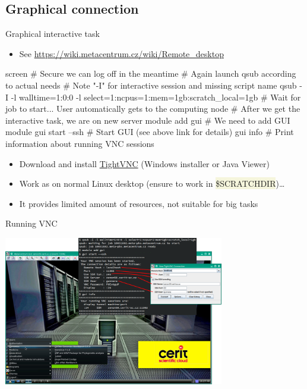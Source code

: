 \documentclass[compress, ucs, xelatex, 11pt, xcolor=svgnames, aspectratio=169,
	hyperref={
		bookmarks=true,
		unicode=true,
		colorlinks=true,
		pdftitle={Linux, command line and MetaCentrum},
		plainpages=false,
		pdfauthor={Vojtech Zeisek},
		pdfsubject={Course about use of Linux command line, writing shell scripts and using MetaCentrum of CESNET},
		pdfcreator={XeLaTeX},
		pdfkeywords={Linux, GNU, BASH, shell, command line, MetaCentrum},
		linkcolor=DarkRed, %
		anchorcolor=DarkBlue, %
		citecolor=Indigo, %
		filecolor=NavyBlue, %
		menucolor=DarkMagenta, %
		urlcolor=DarkBlue, %
		pdftex},
	url={hyphens, lowtilde} %
	]{beamer}
\renewcommand{\texttt}[1]{\colorbox{Beige}{{\ttfamily #1}}}
\begin{document}
\subsection{Graphical connection}

\begin{frame}[fragile]{Graphical interactive task}
	\begin{itemize}
		\item See \url{https://wiki.metacentrum.cz/wiki/Remote_desktop}
	\end{itemize}
	\begin{bashcode}
    screen # Secure we can log off in the meantime
    # Again launch qsub according to actual needs
    # Note "-I" for interactive session and missing script name
    qsub -I -l walltime=1:0:0 -l select=1:ncpus=1:mem=1gb:scratch_local=1gb
    # Wait for job to start... User automatically gets to the computing node
    # After we get the interactive task, we are on new server
    module add gui # We need to add GUI module
    gui start --ssh # Start GUI (see above link for details)
    gui info # Print information about running VNC sessions
	\end{bashcode}
	\begin{itemize}
		\item Download and install \href{https://www.tightvnc.com/}{TightVNC} (Windows installer or Java Viewer)
		\item Work as on normal Linux desktop (ensure to work in \texttt{\$SCRATCHDIR})\ldots
		\item It provides limited amount of resources, not suitable for big tasks
	\end{itemize}
\end{frame}

\begin{frame}{Running VNC}
	\begin{center}
		\includegraphics[height=6.5cm]{vnc.png}
	\end{center}
\end{frame}
\end{document}
